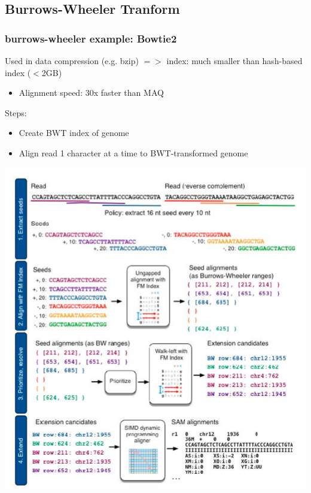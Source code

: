 \documentclass[pdf]{beamer}
\begin{document}
\subsection{Burrows-Wheeler Tranform}
\begin{frame}
  \frametitle{burrows-wheeler example: Bowtie2}
   Used in data compression (e.g. bzip) $=>$ index: much smaller than hash-based index ($<$2GB)
\begin{itemize}
\item Alignment speed: 30x faster than MAQ
\end{itemize}
Steps:\\
\begin{itemize}
\item Create BWT index of genome
\item Align read 1 character at a time to BWT-transformed genome
\end{itemize}
\end{frame}

\begin{frame}
\begin{center}
\includegraphics[scale=.35]{Figures/BWT.png} 
\end{center}
\end{frame}
\end{document}
